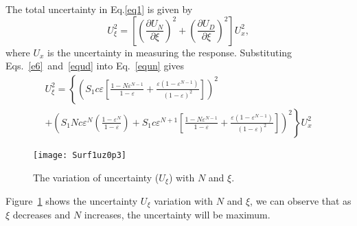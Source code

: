 The total uncertainty in Eq.\eqref{eq1} is given by
\begin{equation}
\label{equn}
U^2_{\xi}=\left[\left(\frac{\partial U_{N}}{\partial \xi}\right)^{2}+\left(\frac{\partial U_{D}}{\partial \xi}\right)^{2}\right]U_x^2,
\end{equation}
where $U_x$ is the uncertainty in measuring the response. 
Substituting Eqs.~\eqref{e6}~and~\eqref{equd} into Eq.~\eqref{equn} gives
\begin{equation}
\label{tuc}
\begin{array}{l}
U_{\xi}^{2}=\left\{\left(S_{1} c \varepsilon\left[\frac{1-N \varepsilon^{N-1}}{1-\varepsilon}+\frac{\varepsilon\left(1-\varepsilon^{N-1}\right)}{(1-\varepsilon)^{2}}\right]\right)^{2}\right. \\
\left.+\left(S_{1} N c \varepsilon^{N}\left(\frac{1-\varepsilon^{N}}{1-\varepsilon}\right)+S_{1} c \varepsilon^{N+1}\left[\frac{1-N \varepsilon^{N-1}}{1-\varepsilon}+\frac{\varepsilon\left(1-\varepsilon^{N-1}\right)}{(1-\varepsilon)^{2}}\right]\right)^{2}\right\}U_x^2
\end{array}
\end{equation}

\begin{figure}[h]

\centering
\texttt{[image: Surf1uz0p3]}

\caption{The variation of uncertainty ($U_{\xi}$) with $N$ and $\xi$.}
\label{4}


\end{figure}

Figure~\ref{4} shows the uncertainty $U_{\xi}$ variation with $N$ and $\xi$, we can observe that as $\xi$ decreases and $N$ increases, the uncertainty will be maximum.

